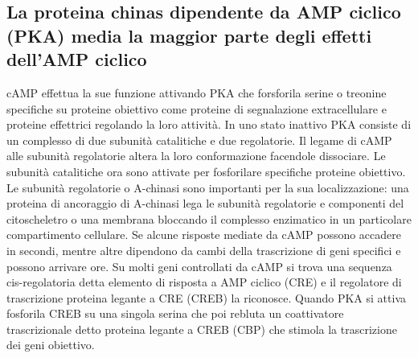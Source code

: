 \subsection{La proteina chinas dipendente da AMP ciclico (PKA) media la maggior parte degli effetti dell'AMP ciclico}
cAMP effettua la sue funzione attivando PKA che forsforila serine o treonine specifiche su proteine obiettivo come proteine di segnalazione extracellulare e proteine effettrici regolando
la loro attivit\`a. In uno stato inattivo PKA consiste di un complesso di due subunit\`a catalitiche e due regolatorie. Il legame di cAMP alle subunit\`a regolatorie altera la loro
conformazione facendole dissociare. Le subunit\`a catalitiche ora sono attivate per fosforilare specifiche proteine obiettivo. Le subunit\`a regolatorie o A-chinasi sono importanti 
per la sua localizzazione: una proteina di ancoraggio di A-chinasi lega le subunit\`a regolatorie e componenti del citoscheletro o una membrana bloccando il complesso enzimatico in
un particolare compartimento cellulare. Se alcune risposte mediate da cAMP possono accadere in secondi, mentre altre dipendono da cambi della trascrizione di geni specifici e possono
arrivare ore. Su molti geni controllati da cAMP si trova una sequenza cis-regolatoria detta elemento di risposta a AMP ciclico (CRE) e il regolatore di trascrizione proteina legante a 
CRE (CREB) la riconosce. Quando PKA si attiva fosforila CREB su una singola serina che poi rebluta un coattivatore trascrizionale detto proteina legante a CREB (CBP) che stimola la
trascrizione dei geni obiettivo. 
